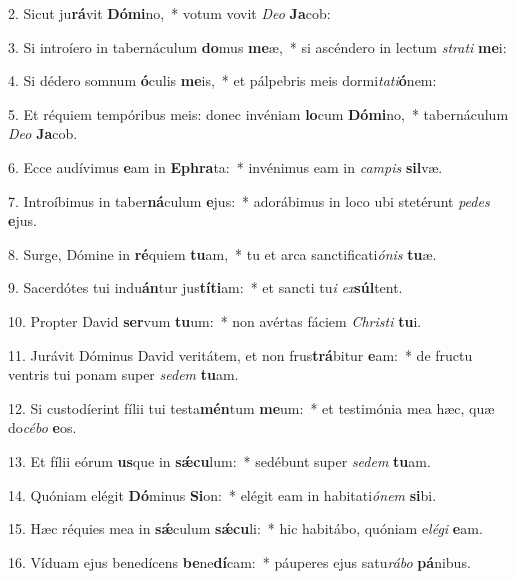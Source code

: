 \item 2. Sicut ju\textbf{rá}vit \textbf{Dó}\textbf{mi}no,~* votum vovit \textit{Deo} \textbf{Ja}cob:
\item 3. Si introíero in tabernáculum \textbf{do}mus \textbf{me}æ,~* si ascéndero in le\-ctum \textit{strati} \textbf{me}i:
\item 4. Si dédero somnum \textbf{ó}culis \textbf{me}is,~* et pálpebris meis dormi\textit{tati}\textbf{ó}nem:
\item 5. Et réquiem tempóribus meis: donec invéniam \textbf{lo}cum \textbf{Dó}\textbf{mi}no,~* tabernáculum \textit{Deo} \textbf{Ja}cob.
\item 6. Ecce audívimus \textbf{e}am in \textbf{E}\textbf{phra}ta:~* invénimus eam in \textit{campis} \textbf{sil}væ.
\item 7. Introíbimus in taber\textbf{ná}culum \textbf{e}jus:~* adorábimus in loco ubi stetérunt \textit{pedes} \textbf{e}jus.
\item 8. Surge, Dómine in \textbf{ré}quiem \textbf{tu}am,~* tu et arca sanctificati\textit{ónis} \textbf{tu}æ.
\item 9. Sacerdótes tui indu\textbf{án}tur jus\textbf{tí}\textbf{ti}am:~* et sancti tu\hspace{0.03em}\textit{i} \textit{ex}\hspace{0.01em}\textbf{súl}tent.
\item 10. Propter David \textbf{ser}vum \textbf{tu}um:~* non avértas fáciem \textit{Christi} \textbf{tu}i.
\item 11. Jurávit Dóminus David veritátem, et non frus\textbf{trá}bitur \textbf{e}am:~* de fructu ventris tui ponam super \textit{sedem} \textbf{tu}am.
\item 12. Si custodíerint fílii tui testa\textbf{mén}tum \textbf{me}um:~* et testimónia mea hæc, quæ do\hspace{0.03em}\textit{cébo} \textbf{e}os.
\item 13. Et fílii eórum \textbf{us}que in \textbf{sǽ}\textbf{cu}lum:~* sedébunt super \textit{sedem} \textbf{tu}am.
\item 14. Quóniam elégit \textbf{Dó}minus \textbf{Si}on:~* elégit eam in habitati\hspace{0.03em}\textit{ónem} \textbf{si}bi.
\item 15. Hæc réquies mea in \textbf{sǽ}culum \textbf{sǽ}\textbf{cu}li:~* hic habitábo, quóniam e\textit{légi} \textbf{e}am.
\item 16. Víduam ejus benedícens \textbf{be}ne\textbf{dí}cam:~* páuperes ejus satu\hspace{0.03em}\textit{rábo} \textbf{pá}nibus.
